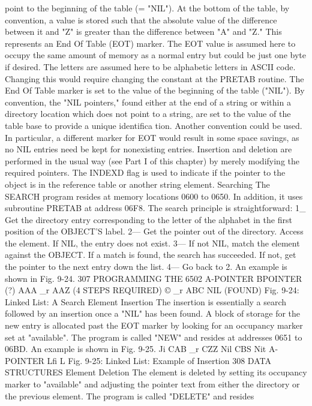 {{{{{{{{{point to the beginning of the table (= "NIL"). At the bottom of the
table, by convention, a value is stored such that the absolute value
of the difference between it and "Z" is greater than the difference
between "A" and "Z." This represents an End Of Table (EOT)
marker. The EOT value is assumed here to occupy the same
amount of memory as a normal entry but could be just one byte if
desired.
The letters are assumed here to be alphabetic letters in ASCII
code. Changing this would require changing the constant at the
PRETAB routine.
The End Of Table marker is set to the value of the beginning of
the table ("NIL").
By convention, the "NIL pointers," found either at the end of a
string or within a directory location which does not point to a string,
are set to the value of the table base to provide a unique identifica
tion. Another convention could be used. In particular, a different
marker for EOT would result in some space savings, as no NIL
entries need be kept for nonexisting entries.
Insertion and deletion are performed in the usual way (see Part I
of this chapter) by merely modifying the required pointers. The
INDEXD flag is used to indicate if the pointer to the object is in
the reference table or another string element.
Searching
The SEARCH program resides at memory locations 0600 to
0650. In addition, it uses subroutine PRETAB at address 06F8.
The search principle is straightforward:
1_ Get the directory entry corresponding to the letter of the
alphabet in the first position of the OBJECT'S label.
2— Get the pointer out of the directory. Access the element. If NIL,
the entry does not exist.
3— If not NIL, match the element against the OBJECT. If a
match is found, the search has succeeded. If not, get the pointer to
the next entry down the list.
4— Go back to 2.
An example is shown in Fig. 9-24.
307
PROGRAMMING THE 6502
A-POINTER
BPOINTER
(?)
AAA _r AAZ
(4 STEPS REQUIRED)
©
_r ABC
NIL
(FOUND)
Fig. 9-24: Linked List: A Search
Element Insertion
The insertion is essentially a search followed by an insertion
once a "NIL" has been found. A block of storage for the new entry
is allocated past the EOT marker by looking for an occupancy
marker set at "available". The program is called "NEW" and
resides at addresses 0651 to 06BD. An example is shown in Fig.
9-25.
Ji CAB _r CZZ
Nil
CBS
Nit
A-POINTER Lfi
L
Fig. 9-25: Linked List: Example of Insertion
308
DATA STRUCTURES
Element Deletion
The element is deleted by setting its occupancy marker to "available"
and adjusting the pointer text from either the directory or the
previous element. The program is called "DELETE" and resides
}}}}}}}}}

